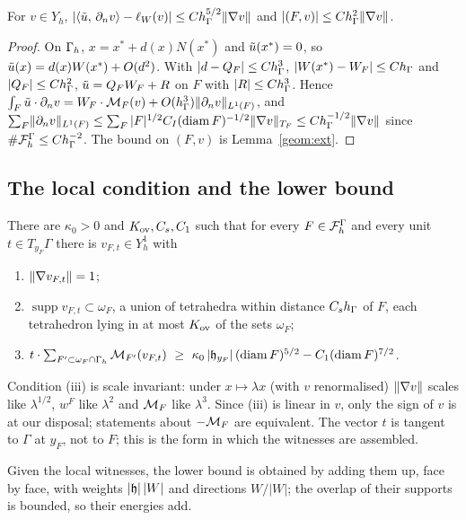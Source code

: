 \begin{lemma}\label{sh:lead}
For $v\in Y_h$, $|\langle \tilde u,\, \partial_n v\rangle-\ell_W(v)|\le Ch_\Gamma^{5/2}\lVert \nabla v\rVert$ and $|(F,v)|\le Ch_\Gamma^2\lVert \nabla v\rVert$.
\end{lemma}

\begin{proof}
On $\Gamma_h$, $x=x^\ast+d(x)N(x^\ast)$ and $\tilde u(x^\ast)=0$, so $\tilde u(x)=d(x)W(x^\ast)+O(d^2)$. With $|d-Q_F|\le Ch_\Gamma^3$, $|W(x^\ast)-W_F|\le Ch_\Gamma$ and $|Q_F|\le Ch_\Gamma^2$, $\tilde u=Q_FW_F+R$ on $F$ with $|R|\le Ch_\Gamma^3$. Hence $\int_F\tilde u\cdot\partial_n v=W_F\cdot\mathcal M_F(v)+O(h_\Gamma^3)\lVert \partial_n v\rVert_{L^1(F)}$, and $\sum_F\lVert \partial_n v\rVert_{L^1(F)}\le\sum_F|F|^{1/2}C_I(\operatorname{diam} F)^{-1/2}\lVert \nabla v\rVert_{T_F}\le Ch_\Gamma^{-1/2}\lVert \nabla v\rVert$ since $\#\mathcal F_h^\Gamma\le Ch_\Gamma^{-2}$. The bound on $(F,v)$ is Lemma~\ref{geom:ext}.
\end{proof}

\subsection{The local condition and the lower bound}
\begin{assumption}[(M3$^3$)]\label{sh:M3}
There are $\kappa_0>0$ and $K_{\rm ov},C_s,C_1$ such that for every $F\in\mathcal F_h^\Gamma$ and every unit $t\in T_{y_F}\Gamma$ there is $v_{F,t}\in Y_h^1$ with
\begin{enumerate}[label=(\roman*)]
\item $\lVert \nabla v_{F,t}\rVert=1$;
\item $\operatorname{supp}v_{F,t}\subset\omega_F$, a union of tetrahedra within distance $C_sh_\Gamma$ of $F$, each tetrahedron lying in at most $K_{\rm ov}$ of the sets $\omega_F$;
\item $t\cdot\sum_{F'\subset\omega_F\cap\Gh}\M_{F'}(v_{F,t})\ \ge\ \kappa_0\,|\hh_{y_F}|\,(\diam F)^{5/2}-C_1(\diam F)^{7/2}$.
\end{enumerate}
\end{assumption}
Condition (iii) is scale invariant: under $x\mapsto\lambda x$ (with $v$ renormalised) $\lVert \nabla v\rVert$ scales like $\lambda^{1/2}$, $w^F$ like $\lambda^2$ and $\mathcal M_F$ like $\lambda^3$. Since (iii) is linear in $v$, only the sign of $v$ is at our disposal; statements about $-\mathcal M_F$ are equivalent. The vector $t$ is tangent to $\Gamma$ at $y_F$, not to $F$; this is the form in which the witnesses are assembled.

Given the local witnesses, the lower bound is obtained by adding them up, face by face, with weights $|\mathfrak h|\,|W|$ and directions $W/|W|$; the overlap of their supports is bounded, so their energies add.

